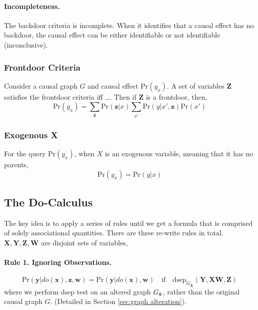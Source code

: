 \documentclass[11pt]{article}
\newcommand{\bw}{\mathbf{w}}
\newcommand{\bx}{\mathbf{x}}
\newcommand{\by}{\mathbf{y}}
\newcommand{\bz}{\mathbf{z}}
\newcommand{\largeover}[1]{\mkern 1.5mu\overline{\mkern-1.5mu#1\mkern-1.5mu}\mkern 1.5mu}
\newcommand{\pr}{\mathrm{Pr}}
\newcommand{\dsep}{\mathrm{dsep}}
\begin{document}
\paragraph{Incompleteness.} The backdoor criteria is incomplete. When it identifies that a causal effect has no backdoor, the causal effect can be either identifiable or not identifiable (inconclusive).  


\subsubsection{Frontdoor Criteria}
Consider a causal graph $G$ and causal effect $\pr(y_x)$. A set of variables $\mathbf Z$ satisfies the frontdoor criteria iff \dots. Then if $\mathbf Z$ is a frontdoor, then, 
\begin{equation}
	\pr ( y _ x ) = \sum _ \bz \pr (\bz | x ) \sum_{x'} \pr(y | x', \bz ) \pr(x')
\end{equation}

\subsubsection{Exogenous X\label{sec:exox}}
For the query $\pr (y_x)$, when $X$ is an exogenous variable, meaning that it has no parents, 
\begin{equation}
	\pr(y _x) = \pr ( y | x)
\end{equation}

\subsection{The Do-Calculus}
The key idea is to apply a series of rules until we get a formula that is comprised of solely associational quantities. There are three re-write rules in total. $\mathbf X, \mathbf Y, \mathbf Z, \mathbf W$ are disjoint sets of variables, 
\paragraph{Rule 1. Ignoring Observations.}
\begin{equation}
	\pr (\by | do(\bx), \bz, \bw) = \pr (\by | do(\bx) , \bw) \quad \text{if} \quad \dsep_{G_{\overbar{\mathbf X}}} (\mathbf Y, \mathbf {XW}, \mathbf Z)
\end{equation}
where we perform $\dsep$ test on an altered graph $G_{\largeover{\mathbf x}}$, rather than the original causal graph $G$. (Detailed in Section \ref{sec:graph alteration}).
\end{document}
